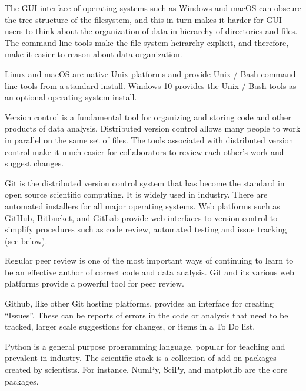 The GUI interface of operating systems such as Windows and macOS can obscure
the tree structure of the filesystem, and this in turn makes it harder for GUI
users to think about the organization of data in hierarchy of directories and
files.  The command line tools make the file system heirarchy explicit, and
therefore, make it easier to reason about data organization.

Linux and macOS are native Unix platforms and provide Unix / Bash command line
tools from a standard install.  Windows 10 provides the Unix / Bash tools as
an optional operating system install.

Version control is a fundamental tool for organizing and storing code and
other products of data analysis.
Distributed version control allows many people to work in parallel on the
same set of files.
The tools associated with distributed version control make it much easier
for collaborators to review each other's work and suggest changes.

Git is the distributed version control system that has become the standard in
open source scientific computing. It is widely used in industry.
There are automated installers for all major operating systems.
Web platforms such as GitHub, Bitbucket, and GitLab provide web interfaces
to version control to simplify procedures such as code review, automated
testing and issue tracking (see below).

Regular peer review is one of the most important ways of continuing to learn
to be an effective author of correct code and data analysis.  Git and its
various web platforms provide a powerful tool for peer review.

Github, like other Git hosting platforms, provides an interface for creating
``Issues''.  These can be reports of errors in the code or analysis that need
to be tracked, larger scale suggestions for changes, or items in a To Do list.



Python is a general purpose programming language,
popular for teaching and prevalent in industry.
The scientific stack is a collection of add-on packages created by scientists.
For instance, NumPy, SciPy, and matplotlib are the core packages.

